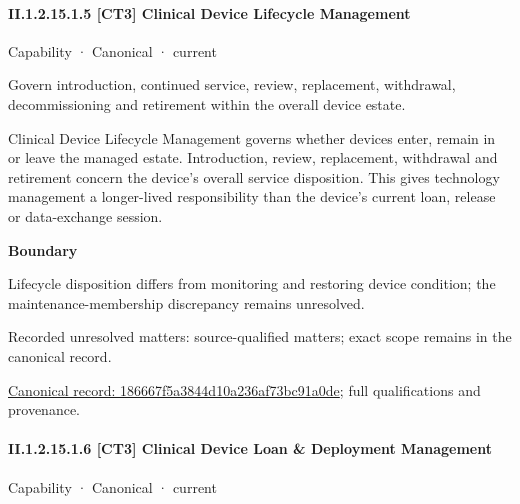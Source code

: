 \paragraph*{II.1.2.15.1.5 [CT3] Clinical Device Lifecycle Management}
\label{navigation:II.1.2.15.1.5}

\label{element:186667f5a3844d10a236af73bc91a0de}
{\small Capability · Canonical · current}\par

Govern introduction, continued service, review, replacement, withdrawal, decommissioning and retirement within the overall device estate.



Clinical Device Lifecycle Management governs whether devices enter, remain in or leave the managed estate. Introduction, review, replacement, withdrawal and retirement concern the device's overall service disposition. This gives technology management a longer-lived responsibility than the device's current loan, release or data-exchange session.



\textbf{Boundary}



Lifecycle disposition differs from monitoring and restoring device condition; the maintenance-membership discrepancy remains unresolved.


{\small Recorded unresolved matters: source-qualified matters; exact scope remains in the canonical record.}\par
{\footnotesize \href{../../../../continuum/strategy/capability/186667f5a3844d10a236af73bc91a0de.md}{Canonical record: 186667f5a3844d10a236af73bc91a0de}; full qualifications and provenance.}\par
\paragraph*{II.1.2.15.1.6 [CT3] Clinical Device Loan \& Deployment Management}
\label{navigation:II.1.2.15.1.6}

\label{element:5ac802cf322d408f82c4a28cd24cb43b}
{\small Capability · Canonical · current}\par

